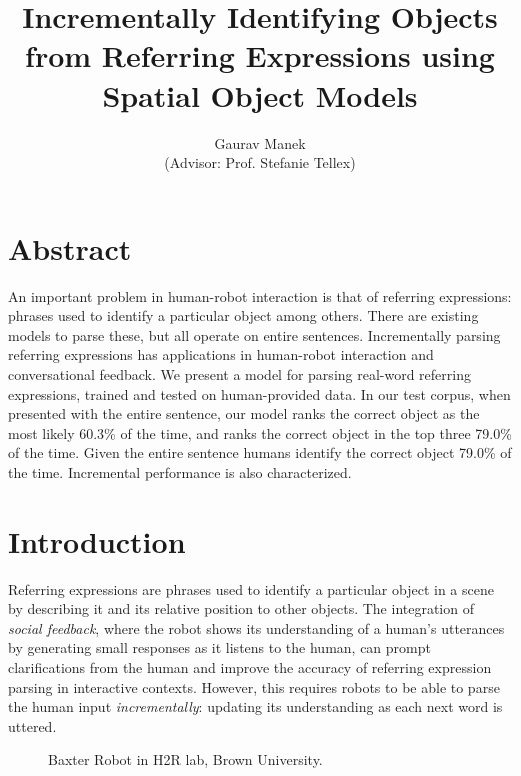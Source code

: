 \documentclass[conference]{IEEEtran}
\title{Incrementally Identifying Objects from Referring Expressions using Spatial Object Models}
\author{Gaurav Manek\\(Advisor: Prof. Stefanie Tellex)}
\numberwithin{equation}{section}
\begin{document}
\maketitle

\section{Abstract}
An important problem in human-robot interaction is that of referring expressions: phrases used to identify a particular object among others. There are existing models to parse these, but all operate on entire sentences. Incrementally parsing referring expressions has applications in human-robot interaction and conversational feedback. We present a model for parsing real-word referring expressions, trained and tested on human-provided data. In our test corpus, when presented with the entire sentence, our model ranks the correct object as the most likely 60.3\% of the time, and ranks the correct object in the top three 79.0\% of the time. Given the entire sentence humans identify the correct object 79.0\% of the time. Incremental performance is also characterized.


\section{Introduction}

Referring expressions are phrases used to identify a particular object in a scene by describing it and its relative position to other objects. The integration of \emph{social feedback}, where the robot shows its understanding of a human's utterances by generating small responses as it listens to the human, can prompt clarifications from the human and improve the accuracy of referring expression parsing in interactive contexts. However, this requires robots to be able to parse the human input \emph{incrementally}: updating its understanding as each next word is uttered. 


\begin{figure}[!tb]
  \centering
  \label{fig:robot}

  \caption{Baxter Robot in H2R lab, Brown University.}
\end{figure}
\end{document}
